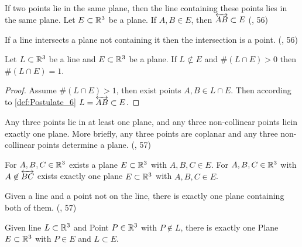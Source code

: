 \begin{definition}[Postulate 6]\label{def:Postulate_6}
  If two points lie in the same plane, then the line containing these points lies in the same plane.
  Let $E \subset \mathbb{R}^3$ be a plane. If $A,B \in E$, then $\overleftrightarrow{AB} \subset E$
  (\cite{SMSGGeometry}, 56)
\end{definition}

\begin{theorem}[3-2.]\label{3-2.}
    If a line intersects a plane not containing it then the intersection is a point.
    (\cite{SMSGGeometry}, 56)

    Let $L \subset \mathbb{R}^3$ be a line and $E \subset \mathbb{R}^3$ be a plane.
    If $L \not\subset E$ and $\#(L\cap E)>0$ then $\#(L\cap E)=1$.
\end{theorem}

\begin{proof}
  Assume $\#(L\cap E)>1$, then exist points $A,B \in L\cap E$.
  Then according to \ref{def:Postulate_6} $L=\overleftrightarrow{AB}\subset E$.
\end{proof}

\begin{definition}[Postulate 7]\label{def:Postulate_7}
  Any three points lie in at least one plane, and any three non-collinear points liein exactly one plane.
  More briefly, any three points are coplanar and any three non-collinear points determine a plane.
  (\cite{SMSGGeometry}, 57)

  For $A,B,C \in \mathbb{R}^3$ exists a plane $E \subset \mathbb{R}^3$ with $A,B,C \in E$.
  For $A,B,C \in \mathbb{R}^3$ with $A \not\in \overleftrightarrow{BC}$ exists exactly one plane $E \subset \mathbb{R}^3$ with $A,B,C \in E$.
\end{definition}

\begin{theorem}[3-3.]\label{thm:3-3.}
  Given a line and a point not on the line, there is exactly one plane containing both of them.
  (\cite{SMSGGeometry}, 57)

  Given line $L \subset \mathbb{R}^3$ and Point $P\in \mathbb{R}^3$ with $P \not\in L$, there is exactly one Plane $E \subset \mathbb{R}^3$ with $P \in E$ and $L \subset E$.
\end{theorem}

